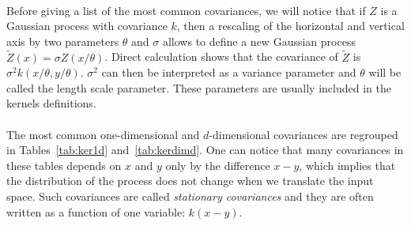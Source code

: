 \documentclass[twoside,openright]{report}
\begin{document}
\paragraph{} 
Before giving a list of the most common covariances, we will notice that if $Z$ is a Gaussian process with covariance $k$, then a rescaling of the horizontal and vertical axis by two parameters $\theta$ and $\sigma$ allows to define a new Gaussian process $\tilde{Z}(x) = \sigma Z(x/\theta)$. Direct calculation shows that the covariance of $\tilde{Z}$ is $\sigma^2 k(x/\theta,y/\theta)$. $\sigma^2$ can then be interpreted as a variance parameter and $\theta$  will be called the length scale parameter. These parameters are usually included in the kernels definitions.

\paragraph{} 
The most common one-dimensional and $d$-dimensional covariances are regrouped in Tables~\ref{tab:ker1d} and~\ref{tab:kerdimd}. One can notice that many covariances in these tables depends on $x$ and $y$ only by the difference $x-y$, which implies that the distribution of the process does not change when we translate the input space. Such covariances are called \emph{stationary covariances} and they are often written as a function of one variable: $k(x-y)$.
\end{document}
